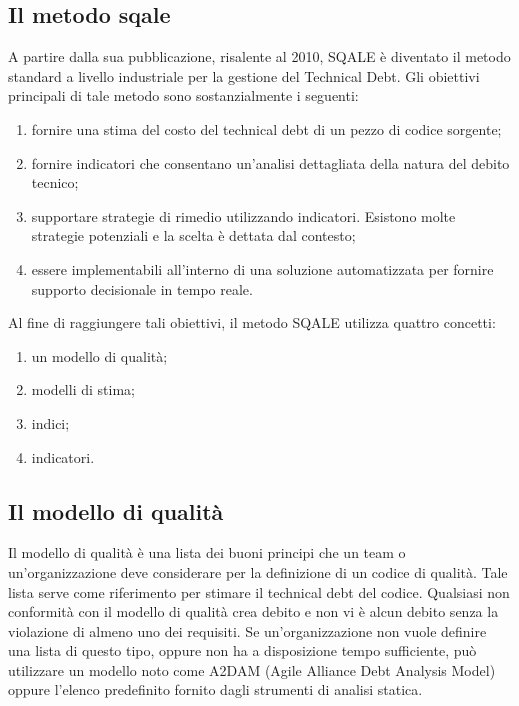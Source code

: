 \subsection{Il metodo sqale}
A partire dalla sua pubblicazione, risalente al 2010, SQALE è diventato il metodo standard a livello industriale per la gestione del Technical Debt. Gli obiettivi principali di tale metodo sono sostanzialmente i seguenti:
\begin{enumerate}
	\item fornire una stima del costo del technical debt di un pezzo di codice sorgente;
	\item fornire indicatori che consentano un'analisi  dettagliata della natura del debito tecnico;
	\item supportare strategie di rimedio utilizzando indicatori. Esistono molte strategie potenziali e la scelta è dettata dal contesto;
	\item essere implementabili all'interno di una soluzione automatizzata per fornire supporto decisionale in tempo reale.
\end{enumerate}
Al fine di raggiungere tali obiettivi, il metodo SQALE utilizza quattro concetti:
\begin{enumerate}
	\item un modello di qualità;
	\item modelli di stima;
	\item indici;
	\item indicatori.
\end{enumerate}
\subsection{Il modello di qualità}
Il modello di qualità è una lista dei buoni principi che un team o un'organizzazione deve considerare per la definizione di un codice di qualità. Tale lista serve come riferimento per stimare il technical debt del codice. Qualsiasi non conformità con il modello di qualità crea debito e non vi è alcun debito senza la violazione di almeno uno dei requisiti. Se un'organizzazione non vuole definire una lista di questo tipo, oppure non ha a disposizione tempo sufficiente, può utilizzare un modello noto come A2DAM (Agile Alliance Debt Analysis Model) oppure l'elenco predefinito fornito dagli strumenti di analisi statica.

